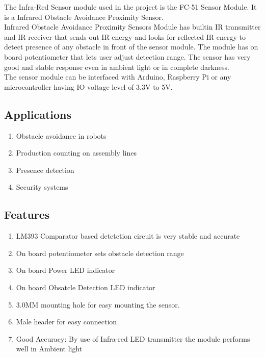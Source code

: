 The Infra-Red Sensor module used in the project is the FC-51 Sensor Module\cite{fc51}. It is a Infrared Obstacle Avoidance Proximity Sensor.\\ 
Infrared Obstacle Avoidance Proximity Sensors Module has builtin IR transmitter and IR receiver that sends out IR energy and looks for reflected IR energy to detect presence of any obstacle in front of the sensor module. The module has on board potentiometer that lets user adjust detection range. The sensor has very good and stable response even in ambient light or in complete darkness.\\
The sensor module can be interfaced with Arduino, Raspberry Pi or any microcontroller having IO voltage level of 3.3V to 5V.
\subsection*{Applications}
\begin{enumerate}
\item Obstacle avoidance in robots 
\item Production counting on assembly lines 
\item Presence detection 
\item Security systems 
\end{enumerate}
\subsection*{Features}
\begin{enumerate}
\item LM393 Comparator based detetction circuit is very stable and accurate 
\item On board potentiometer sets obstacle detection range 
\item On board Power LED indicator 
\item On board Obsatcle Detection LED indicator 
\item 3.0MM mounting hole for easy mounting the sensor. 
\item Male header for easy connection 
\item Good Accuracy: By use of Infra-red LED transmitter the module performs well in Ambient light
\end{enumerate}
